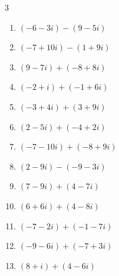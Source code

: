 \begin{multicols}{3}
\begin{enumerate}
  \item $\displaystyle (-6-3i) - (9-5i)$

        \phantom{$\displaystyle =-15+2i$}

  \item $\displaystyle (-7+10i) - (1+9i)$

        \phantom{$\displaystyle =-8+i$}

  \item $\displaystyle (9-7i) + (-8+8i)$

        \phantom{$\displaystyle =1+i$}

  \item $\displaystyle (-2+i) + (-1+6i)$

        \phantom{$\displaystyle =-3+7i$}

  \item $\displaystyle (-3+4i) + (3+9i)$

        \phantom{$\displaystyle =13i$}

  \item $\displaystyle (2-5i) + (-4+2i)$

        \phantom{$\displaystyle =-2-3i$}

  \item $\displaystyle (-7-10i) + (-8+9i)$

        \phantom{$\displaystyle =-15-i$}

  \item $\displaystyle (2-9i) - (-9-3i)$

        \phantom{$\displaystyle =11-6i$}

  \item $\displaystyle (7-9i) + (4-7i)$

        \phantom{$\displaystyle =11-16i$}

  \item $\displaystyle (6+6i) + (4-8i)$

        \phantom{$\displaystyle =10-2i$}

  \item $\displaystyle (-7-2i) + (-1-7i)$

        \phantom{$\displaystyle =-8-9i$}

  \item $\displaystyle (-9-6i) + (-7+3i)$

        \phantom{$\displaystyle =-16-3i$}

  \item $\displaystyle (8+i) + (4-6i)$

        \phantom{$\displaystyle =12-5i$}


\end{enumerate}
\end{multicols}
